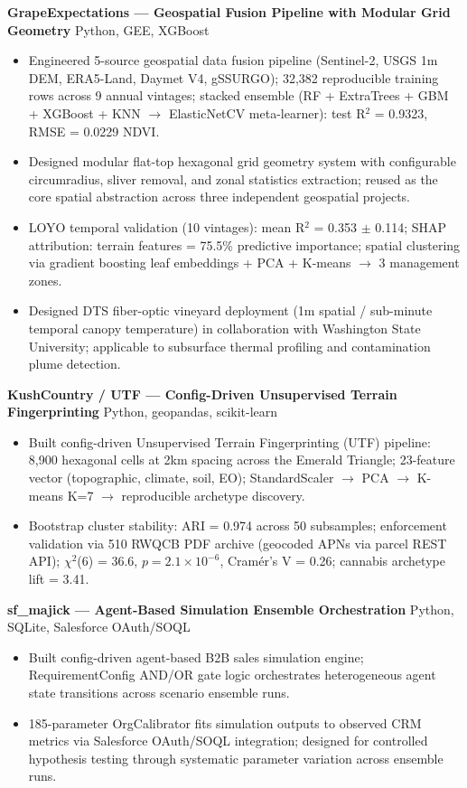 \documentclass[11pt,a4paper]{article}
\begin{document}
\vspace{0.2cm}
\noindent
\textbf{GrapeExpectations --- Geospatial Fusion Pipeline with Modular Grid Geometry} \hfill Python, GEE, XGBoost
\begin{itemize}
    \item Engineered 5-source geospatial data fusion pipeline (Sentinel-2, USGS 1m DEM, ERA5-Land, Daymet V4, gSSURGO); 32,382 reproducible training rows across 9 annual vintages; stacked ensemble (RF + ExtraTrees + GBM + XGBoost + KNN $\rightarrow$ ElasticNetCV meta-learner): test R$^2$ = 0.9323, RMSE = 0.0229 NDVI.
    \item Designed modular flat-top hexagonal grid geometry system with configurable circumradius, sliver removal, and zonal statistics extraction; reused as the core spatial abstraction across three independent geospatial projects.
    \item LOYO temporal validation (10 vintages): mean R$^2$ = 0.353 $\pm$ 0.114; SHAP attribution: terrain features = 75.5\% predictive importance; spatial clustering via gradient boosting leaf embeddings + PCA + K-means $\rightarrow$ 3 management zones.
    \item Designed DTS fiber-optic vineyard deployment (1m spatial / sub-minute temporal canopy temperature) in collaboration with Washington State University; applicable to subsurface thermal profiling and contamination plume detection.
\end{itemize}

\vspace{0.2cm}
\noindent
\textbf{KushCountry / UTF --- Config-Driven Unsupervised Terrain Fingerprinting} \hfill Python, geopandas, scikit-learn
\begin{itemize}
    \item Built config-driven Unsupervised Terrain Fingerprinting (UTF) pipeline: 8,900 hexagonal cells at 2km spacing across the Emerald Triangle; 23-feature vector (topographic, climate, soil, EO); StandardScaler $\rightarrow$ PCA $\rightarrow$ K-means K=7 $\rightarrow$ reproducible archetype discovery.
    \item Bootstrap cluster stability: ARI = 0.974 across 50 subsamples; enforcement validation via 510 RWQCB PDF archive (geocoded APNs via parcel REST API); $\chi^2$(6) = 36.6, $p = 2.1 \times 10^{-6}$, Cram\'er's V = 0.26; cannabis archetype lift = 3.41.
\end{itemize}

\vspace{0.2cm}
\noindent
\textbf{sf\_majick --- Agent-Based Simulation Ensemble Orchestration} \hfill Python, SQLite, Salesforce OAuth/SOQL
\begin{itemize}
    \item Built config-driven agent-based B2B sales simulation engine; RequirementConfig AND/OR gate logic orchestrates heterogeneous agent state transitions across scenario ensemble runs.
    \item 185-parameter OrgCalibrator fits simulation outputs to observed CRM metrics via Salesforce OAuth/SOQL integration; designed for controlled hypothesis testing through systematic parameter variation across ensemble runs.
\end{itemize}
\end{document}
